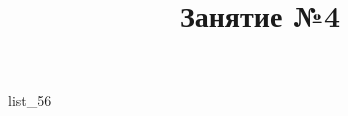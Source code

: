 \documentclass[12pt, a4paper]{article}
\begin{document}
	\title{Занятие №4}
	{list_56}
\end{document}
